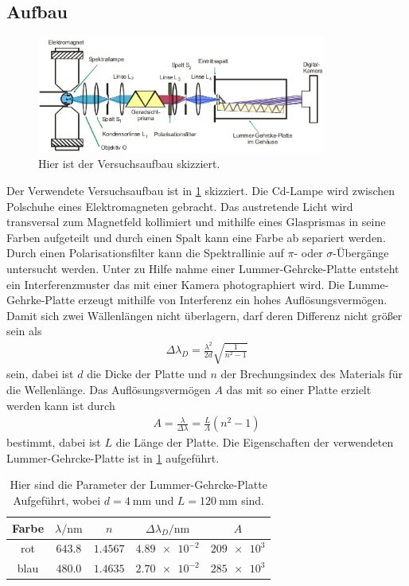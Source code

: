 \subsection{Aufbau}
\begin{figure}[h!]
		\centering
		\includegraphics[width = 0.85\textwidth]{../Grafiken/Aufbau.jpg}
		\caption{Hier ist der Versuchsaufbau skizziert. \cite{V27}\label{fig:Versuchsaufbau}}
\end{figure}
\noindent
Der Verwendete Versuchsaufbau ist in \cref{fig:Versuchsaufbau} skizziert.
Die Cd-Lampe wird zwischen Polschuhe eines Elektromagneten gebracht.
Das austretende Licht wird transversal zum Magnetfeld kollimiert und mithilfe eines Glasprismas in seine Farben aufgeteilt und durch einen Spalt kann eine Farbe ab separiert werden.
Durch einen Polarisationsfilter kann die Spektrallinie auf $\pi$- oder $\sigma$-Übergänge untersucht werden.
Unter zu Hilfe nahme einer Lummer-Gehrcke-Platte entsteht ein Interferenzmuster das mit einer Kamera photographiert wird.
Die Lumme-Gehrke-Platte erzeugt mithilfe von Interferenz ein hohes Auflösungsvermögen.
Damit sich zwei Wällenlängen nicht überlagern, darf deren Differenz nicht größer sein als
\begin{align}
	\Delta \lambda_D =\frac{\lambda^2}{2d}\sqrt{\frac{1}{n^2-1}}
\end{align}
sein, dabei ist $d$ die Dicke der Platte und $n$ der Brechungsindex des Materials für die Wellenlänge.
Das Auflösungsvermögen $A$ das mit so einer Platte erzielt werden kann ist durch
\begin{align}
	A=\frac{\lambda}{\Delta\lambda}=\frac{L}{\Lambda}(n^2-1)
\end{align}
bestimmt, dabei ist $L$ die Länge der Platte.
Die Eigenschaften der verwendeten Lummer-Gehrcke-Platte ist in \cref{tab:Lummer-Gehrcke} aufgeführt.
\begin{table}[h!]
	\centering
	\begin{tabular}{ccccc}
		\toprule
		Farbe & $\lambda/\si{\nano\meter}$& $n$ & $\Delta\lambda_D/\si{\nano\meter}$& $A$\\\midrule
		rot & $\num{643,8}$ & $\num{1,4567}$ & $\num{4.89e-2}$ & $\num{209e3}$\\
		blau & $\num{480,0}$& $\num{1,4635}$ & $\num{2,70e-2}$ & $\num{285e3}$\\\bottomrule
	\end{tabular}
	\caption{Hier sind die Parameter der Lummer-Gehrcke-Platte Aufgeführt, wobei $d=\SI{4}{\milli\meter}$ und $L=\SI{120}{\milli\meter}$ sind. \label{tab:Lummer-Gehrcke}}
\end{table}

